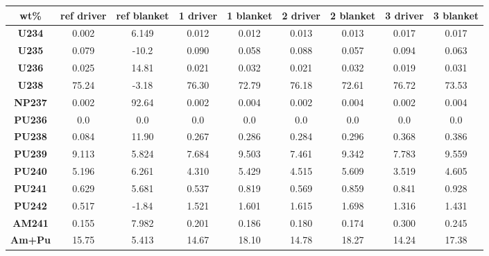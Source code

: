 	\begin{tabular}{c|cc|cc|cc|cc}
		\hline
		\textbf{wt\%} & \textbf{ref driver} & \textbf{ref blanket} & \textbf{1 driver} & \textbf{1 blanket} & \textbf{2 driver} & \textbf{2 blanket} & \textbf{3 driver} & \textbf{3 blanket} \\ 		\hline
		\textbf{U234} & 0.002 & 6.149 & 0.012 & 0.012 & 0.013 & 0.013 & 0.017 & 0.017 \\ 
		\textbf{U235} & 0.079 & -10.2 & 0.090 & 0.058 & 0.088 & 0.057 & 0.094 & 0.063 \\ 
		\textbf{U236} & 0.025 & 14.81 & 0.021 & 0.032 & 0.021 & 0.032 & 0.019 & 0.031 \\ 
		\textbf{U238} & 75.24 & -3.18 & 76.30 & 72.79 & 76.18 & 72.61 & 76.72 & 73.53 \\ 
		\textbf{NP237} & 0.002 & 92.64 & 0.002 & 0.004 & 0.002 & 0.004 & 0.002 & 0.004 \\ 
		\textbf{PU236} & 0.0 & 0.0 & 0.0 & 0.0 & 0.0 & 0.0 & 0.0 & 0.0 \\ 
		\textbf{PU238} & 0.084 & 11.90 & 0.267 & 0.286 & 0.284 & 0.296 & 0.368 & 0.386 \\ 
		\textbf{PU239} & 9.113 & 5.824 & 7.684 & 9.503 & 7.461 & 9.342 & 7.783 & 9.559 \\ 
		\textbf{PU240} & 5.196 & 6.261 & 4.310 & 5.429 & 4.515 & 5.609 & 3.519 & 4.605 \\ 
		\textbf{PU241} & 0.629 & 5.681 & 0.537 & 0.819 & 0.569 & 0.859 & 0.841 & 0.928 \\ 
		\textbf{PU242} & 0.517 & -1.84 & 1.521 & 1.601 & 1.615 & 1.698 & 1.316 & 1.431 \\ 
		\textbf{AM241} & 0.155 & 7.982 & 0.201 & 0.186 & 0.180 & 0.174 & 0.300 & 0.245 \\ 
		\hline
		\hline
		\textbf{Am+Pu} & 15.75 & 5.413 & 14.67 & 18.10 & 14.78 & 18.27 & 14.24 & 17.38 \\ 
		\hline 
	\end{tabular} 
